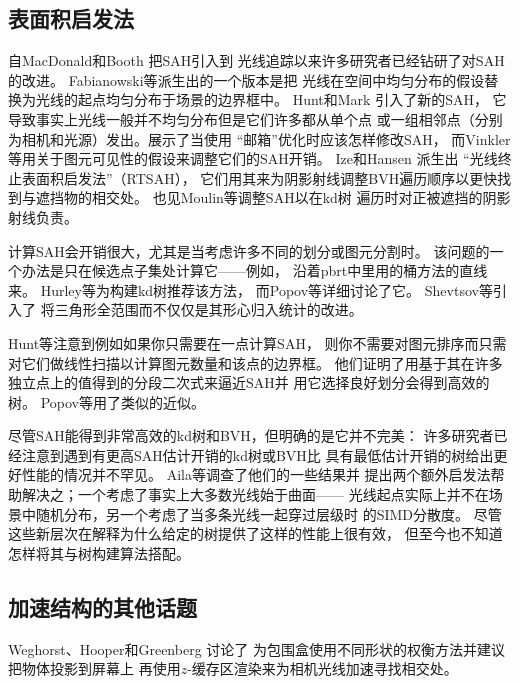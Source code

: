 \subsection{表面积启发法}\label{sub:表面积启发法2}
自MacDonald和Booth \parencite*{MacDonald1990}把SAH引入到
光线追踪以来许多研究者已经钻研了对SAH的改进。
Fabianowski等\parencite*{10.2312:egs.20091046}派生出的一个版本是把
光线在空间中均匀分布的假设替换为光线的起点均匀分布于场景的边界框中。
Hunt和Mark \parencite*{4634614}引入了新的SAH，
它导致事实上光线一般并不均匀分布但是它们许多都从单个点
或一组相邻点（分别为相机和光源）发出。\citet{4634625}展示了当使用
“邮箱”优化时应该怎样修改SAH，
而Vinkler等\parencite*{VINKLER2012283}用关于图元可见性的假设来调整它们的SAH开销。
Ize和Hansen \parencite*{10.1111/j.1467-8659.2011.01861.x}派生出
“光线终止表面积启发法”（RTSAH），
它们用其来为阴影射线调整BVH遍历顺序以更快找到与遮挡物的相交处。
也见Moulin等\parencite*{10.2312:sre.20151164}调整SAH以在kd树
遍历时对正被遮挡的阴影射线负责。

计算SAH会开销很大，尤其是当考虑许多不同的划分或图元分割时。
该问题的一个办法是只在候选点子集处计算它——例如，
沿着pbrt中里用的桶方法的直线来。
Hurley等\parencite*{hurley2002fast}为构建kd树推荐该方法，
而Popov等\parencite*{4061550}详细讨论了它。
Shevtsov等\parencite*{10.1111/j.1467-8659.2007.01062.x}引入了
将三角形全范围而不仅仅是其形心归入统计的改进。

Hunt等\parencite*{4061549}注意到例如如果你只需要在一点计算SAH，
则你不需要对图元排序而只需对它们做线性扫描以计算图元数量和该点的边界框。
他们证明了用基于其在许多独立点上的值得到的分段二次式来逼近SAH并
用它选择良好划分会得到高效的树。
Popov等\parencite*{4061550}用了类似的近似。

尽管SAH能得到非常高效的kd树和BVH，但明确的是它并不完美：
许多研究者已经注意到遇到有更高SAH估计开销的kd树或BVH比
具有最低估计开销的树给出更好性能的情况并不罕见。
Aila等\parencite*{10.1145/2492045.2492056}调查了他们的一些结果并
提出两个额外启发法帮助解决之；一个考虑了事实上大多数光线始于曲面——
光线起点实际上并不在场景中随机分布，另一个考虑了当多条光线一起穿过层级时
的SIMD分散度。
尽管这些新层次在解释为什么给定的树提供了这样的性能上很有效，
但至今也不知道怎样将其与树构建算法搭配。

\subsection{加速结构的其他话题}\label{sub:加速结构的其他话题}
Weghorst、Hooper和Greenberg \parencite*{10.1145/357332.357335}讨论了
为包围盒使用不同形状的权衡方法并建议把物体投影到屏幕上
再使用$z$-缓存区渲染来为相机光线加速寻找相交处。

